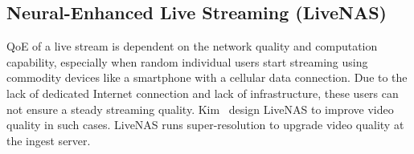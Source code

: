\subsection{Neural-Enhanced Live Streaming (LiveNAS)}
QoE of a live stream is dependent on the network quality and computation capability, especially when random individual users start streaming using commodity devices like a smartphone with a cellular data connection. Due to the lack of dedicated Internet connection and lack of infrastructure, these users can not ensure a steady streaming quality. Kim \etal\ design LiveNAS\cite{10.1145/3387514.3405856} to improve video quality in such cases. LiveNAS runs super-resolution to upgrade video quality at the ingest server.

